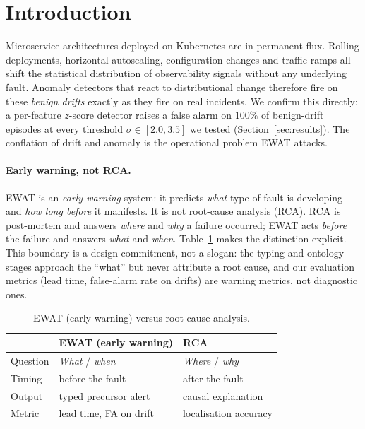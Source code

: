 \section{Introduction}
\label{sec:intro}

Microservice architectures deployed on Kubernetes are in permanent flux. Rolling deployments,
horizontal autoscaling, configuration changes and traffic ramps all shift the statistical
distribution of observability signals without any underlying fault. Anomaly detectors that react
to distributional change therefore fire on these \emph{benign drifts} exactly as they fire on
real incidents. We confirm this directly: a per-feature $z$-score detector raises a false alarm
on $100\%$ of benign-drift episodes at every threshold $\sigma\in[2.0,3.5]$ we tested
(Section~\ref{sec:results}). The conflation of drift and anomaly is the operational problem EWAT
attacks.

\paragraph{Early warning, not RCA.}
EWAT is an \emph{early-warning} system: it predicts \emph{what} type of fault is developing and
\emph{how long before} it manifests. It is not root-cause analysis (RCA). RCA is post-mortem and
answers \emph{where} and \emph{why} a failure occurred; EWAT acts \emph{before} the failure and
answers \emph{what} and \emph{when}. Table~\ref{tab:ewat-vs-rca} makes the distinction explicit.
This boundary is a design commitment, not a slogan: the typing and ontology stages approach the
``what'' but never attribute a root cause, and our evaluation metrics (lead time, false-alarm
rate on drifts) are warning metrics, not diagnostic ones.

\begin{table}[t]
\centering
\caption{EWAT (early warning) versus root-cause analysis.}
\label{tab:ewat-vs-rca}
\small
\begin{tabularx}{\columnwidth}{@{}lXX@{}}
\toprule
 & \textbf{EWAT (early warning)} & \textbf{RCA} \\
\midrule
Question & \emph{What} / \emph{when} & \emph{Where} / \emph{why} \\
Timing   & before the fault          & after the fault \\
Output   & typed precursor alert     & causal explanation \\
Metric   & lead time, FA on drift    & localisation accuracy \\
\bottomrule
\end{tabularx}
\end{table}

